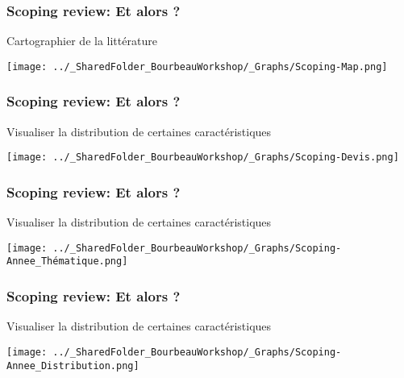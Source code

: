 \documentclass{beamer}
\begin{document}

    \begin{frame}
    
      \frametitle{Scoping review: Et \R alors ?} \vspace{1cm}
      
      Cartographier de la littérature
      
        \begin{center}
         \texttt{[image: ../\_SharedFolder\_BourbeauWorkshop/\_Graphs/Scoping-Map.png]}
        \end{center} 
      
          
    \end{frame}  
    

    \begin{frame}
    
      \frametitle{Scoping review: Et \R alors ?} \vspace{1cm}
      
      Visualiser la distribution de certaines caractéristiques
      
        \begin{center}
         \texttt{[image: ../\_SharedFolder\_BourbeauWorkshop/\_Graphs/Scoping-Devis.png]}
        \end{center} 
      
          
    \end{frame}  
    

    \begin{frame}
    
      \frametitle{Scoping review: Et \R alors ?} \vspace{1cm}
      
      Visualiser la distribution de certaines caractéristiques
      
        \begin{center}
         \texttt{[image: ../\_SharedFolder\_BourbeauWorkshop/\_Graphs/Scoping-Annee\_Thématique.png]}
        \end{center} 
      
          
    \end{frame}  
    

    \begin{frame}
    
      \frametitle{Scoping review: Et \R alors ?} \vspace{1cm}
      
      Visualiser la distribution de certaines caractéristiques
      
     \begin{center}
         \texttt{[image: ../\_SharedFolder\_BourbeauWorkshop/\_Graphs/Scoping-Annee\_Distribution.png]}
        \end{center} 
      
          
    \end{frame}  
    
\end{document}
